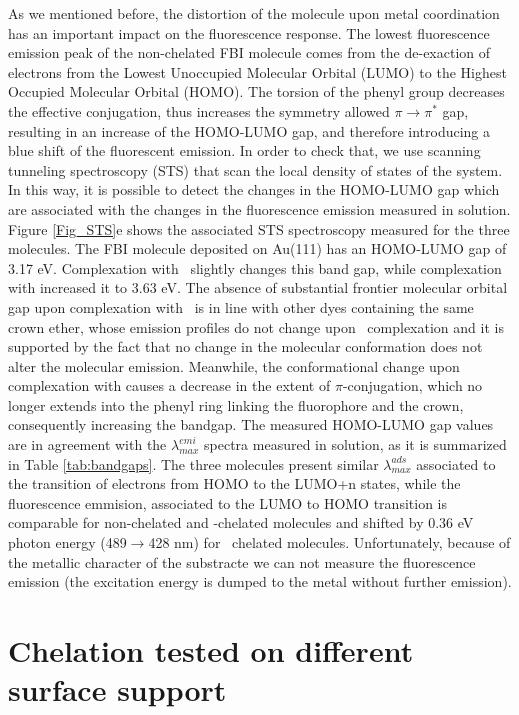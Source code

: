 \documentclass[aps,prl,reprint,longbibliography,superscriptaddress, english]{revtex4-1}
\begin{document}
As we mentioned before, the distortion of the molecule upon metal coordination has an important impact on the fluorescence response. The lowest fluorescence emission peak of the non-chelated FBI molecule comes from the de-exaction of electrons from the Lowest Unoccupied Molecular Orbital (LUMO) to the Highest Occupied Molecular Orbital (HOMO). The torsion of the phenyl group decreases the effective conjugation, thus increases the symmetry allowed $\pi \rightarrow \pi^*$ gap, resulting in an increase of the HOMO-LUMO gap, and therefore introducing a blue shift of the fluorescent emission. In order to check that, we use scanning tunneling spectroscopy (STS) that scan the local density of states of the system. In this way, it is possible to detect the changes in the HOMO-LUMO gap which are associated with the changes in the fluorescence emission measured in solution. Figure {\ref{Fig_STS}e} shows the associated STS spectroscopy measured for the three molecules. The FBI molecule deposited on Au(111) has an HOMO-LUMO gap of 3.17 eV. Complexation with \Nap\ slightly changes this band gap, while complexation with \Bapp increased it to 3.63 eV. The absence of substantial frontier molecular orbital gap upon complexation with \Nap\ is in line with other dyes containing the same crown ether, whose emission profiles do not change upon \Nap\ complexation \cite{ast_high_2011} and it is supported by the fact that no change in the molecular conformation does not alter the molecular emission. Meanwhile, the conformational change upon complexation with \Bapp causes a decrease in the extent of $\pi$-conjugation, which no longer extends into the phenyl ring linking the fluorophore and the crown, consequently increasing the bandgap.  The measured HOMO-LUMO gap values are in agreement with the $\lambda^{emi}_{max}$ spectra measured in solution, as it is summarized in Table \ref{tab:bandgaps}. The three molecules present similar $\lambda^{ads}_{max}$ associated to the transition of electrons from HOMO to the LUMO+n states, while the fluorescence emmision, associated to the LUMO to HOMO transition is comparable for non-chelated and \Nap-chelated molecules and shifted by 0.36 eV photon energy (489$\rightarrow$428 nm) for \Bapp\ chelated molecules. Unfortunately, because of the metallic character of the substracte we can not measure the fluorescence emission (the excitation energy is dumped to the metal without further emission). 

\section{Chelation tested on different surface support}
\end{document}
